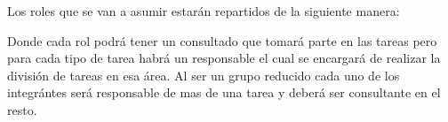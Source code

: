 Los roles que se van a asumir estarán repartidos de la siguiente manera:


Donde cada rol podrá tener un consultado que tomará parte en las tareas pero para cada tipo de tarea habrá un responsable el cual se encargará de realizar la división de tareas en esa área. Al ser un grupo reducido cada uno de los integrántes será responsable de mas de una tarea y deberá ser consultante en el resto.


